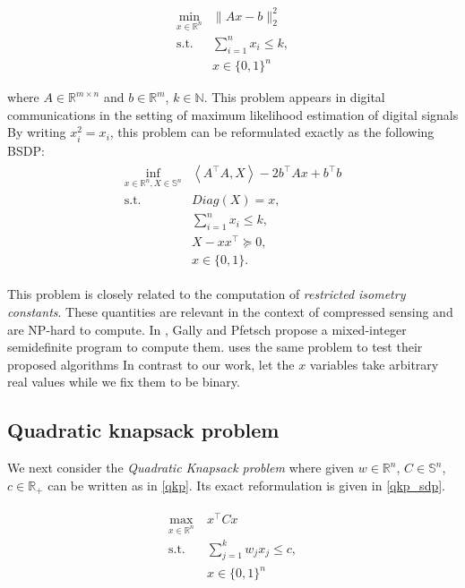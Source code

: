 \documentclass{article}
\begin{document}
\begin{equation}
\begin{aligned}
\min_{x \in \mathbb{R}^n}  &\|Ax-b\|^2_2 \\
\text{s.t.} & \sum_{i=1}^n x_i \leq k, \\
& x \in \{0,1\}^n
\end{aligned}
\end{equation}

where $A \in \mathbb{R}^{m \times n}$ and $b \in \mathbb{R}^m$, $k\in \mathbb{N}$. This problem appears in digital communications in the setting of maximum likelihood estimation of digital signals \cite{park2017general}  By writing $x_i^2 = x_i$, this problem can be reformulated exactly as the following BSDP:
\begin{gather}\label{BLS_SDP}\tag{BLSSDP}
\begin{aligned}
\inf_{x \in \mathbb{R}^n, X\in \mathbb{S}^n} & \left \langle A^\top A,X \right \rangle - 2b^\top A x + b^\top b  \\
    \text{s.t. } & Diag(X) = x,  \\
    & \sum_{i=1}^n x_i \leq k,\\
    & X-xx^\top \succeq 0, \\
    & x \in \{0,1\}.
\end{aligned}
\end{gather}


This problem is closely related to the computation of
\emph{restricted isometry constants}. These quantities are relevant in the context of compressed sensing and are NP-hard to compute.
In \cite{gally2016computing}, Gally and Pfetsch propose a mixed-integer semidefinite program to compute them. \cite{kobayashi2020branch} uses the same problem to test their proposed algorithms  In contrast to our work, \cite{gally2016computing,kobayashi2020branch} let the $x$ variables take arbitrary real values while we fix them to be binary. 


\subsection{Quadratic knapsack problem}



We next consider the \emph{Quadratic Knapsack problem } \cite{pisinger2007quadratic} where given $w \in \mathbb{R}^n$, $C \in \mathbb{S}^n$, $c \in \mathbb{R}_+$ can be written as in \ref{qkp}. Its exact reformulation is given in \ref{qkp_sdp}.

\begin{gather}\label{qkp}\tag{QK}
\begin{aligned}
\max_{x \in \mathbb{R}^n} & \  x^\top C x  \\
\text{s.t.} & \ \sum_{j=1}^k w_j x_j  \leq c, \\ 
& \  x \in \{0,1\}^n 
\end{aligned}
\end{gather}
\end{document}
